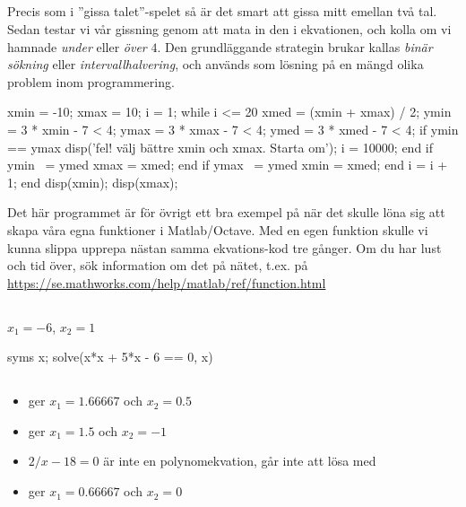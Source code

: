 \subsection*{}
Precis som i ''gissa talet''-spelet så är det smart att gissa mitt emellan två tal. Sedan testar vi vår gissning  genom att mata in den i ekvationen, och kolla om vi hamnade \emph{under} eller \emph{över} $4$. Den grundläggande strategin brukar kallas \emph{binär sökning} eller \emph{intervallhalvering}, och används som lösning på en mängd olika problem inom programmering.
\vspace{10pt}
\begin{matlab}
xmin = -10; %
xmax = 10; %
i = 1;
while i <= 20 %
	xmed = (xmin + xmax) / 2; %
	ymin = 3 * xmin - 7 < 4;
	ymax = 3 * xmax - 7 < 4;
	ymed = 3 * xmed - 7 < 4;
	if ymin == ymax
		disp('fel! välj bättre xmin och xmax. Starta om');
	    i = 10000; %
	end
	if ymin ~= ymed
		xmax = xmed;
	end
	if ymax ~= ymed
		xmin = xmed;
	end
	i = i + 1;
end
disp(xmin);
disp(xmax);
\end{matlab}
Det här programmet är för övrigt ett bra exempel på när det skulle löna sig att skapa våra egna funktioner i Matlab/Octave. Med en egen funktion skulle vi kunna slippa upprepa nästan samma ekvations-kod tre gånger. Om du har lust och tid över, sök information om det på nätet, t.ex. på \url{https://se.mathworks.com/help/matlab/ref/function.html}


\subsection*{}
$x_{1}=-6$, $x_{2}=1$
\vspace{10pt}
\begin{matlab}
syms x;
solve(x*x + 5*x - 6 == 0, x)
\end{matlab}

\subsection*{}
\begin{itemize}
\item {} ger $x_{1}=1.66667$ och $x_{2}=0.5$
\item {} ger $x_{1}=1.5$ och $x_{2}=-1$
\item $2/x - 18 = 0$ är inte en polynomekvation, går inte att lösa med 
\item {} ger $x_{1}=0.66667$ och $x_{2}=0$
\end{itemize}
\newpage
